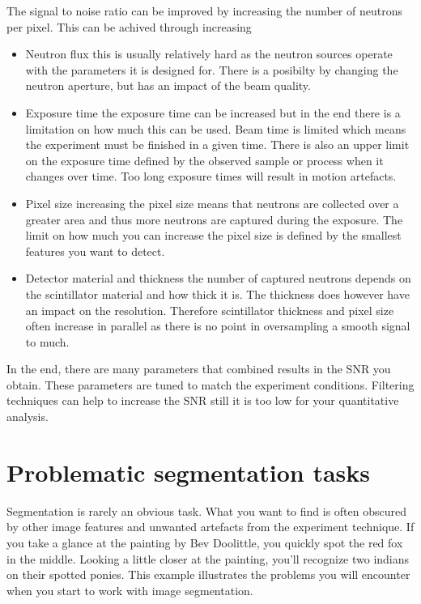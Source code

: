 \documentclass[letterpaper,10pt,english]{sphinxmanual}
\begin{document}
The signal to noise ratio can be improved by increasing the number of neutrons per pixel. This can be achived through increasing
\begin{itemize}
\item {} 
Neutron flux \sphinxhyphen{} this is usually relatively hard as the neutron sources operate with the parameters it is designed for. There is a posibilty by changing the neutron aperture, but has an impact of the beam quality.

\item {} 
Exposure time \sphinxhyphen{} the exposure time can be increased but in the end there is a limitation on how much this can be used. Beam time is limited which means the experiment must be finished in a given time. There is also an upper limit on the exposure time defined by the observed sample or process when it changes over time. Too long exposure times will result in motion artefacts.

\item {} 
Pixel size \sphinxhyphen{} increasing the pixel size means that neutrons are collected over a greater area and thus more neutrons are captured during the exposure. The limit on how much you can increase the pixel size is defined by the smallest features you want to detect.

\item {} 
Detector material and thickness \sphinxhyphen{} the number of captured neutrons depends on the scintillator material and how thick it is. The thickness does however have an impact on the resolution. Therefore scintillator thickness and pixel size often increase in parallel as there is no point in oversampling a smooth signal to much.

\end{itemize}

In the end, there are many parameters that combined results in the SNR you obtain. These parameters are tuned to match the experiment conditions. Filtering techniques can help to increase the SNR still it is too low for your quantitative analysis.


\section{Problematic segmentation tasks}
\label{\detokenize{ML4NeutronImageSegmentation:problematic-segmentation-tasks}}
Segmentation is rarely an obvious task. What you want to find is often obscured by other image features and unwanted artefacts from the experiment technique. If you take a glance at the painting by Bev Doolittle, you quickly spot the red fox in the middle. Looking a little closer at the painting, you’ll recognize two indians on their spotted ponies. This example illustrates the problems you will encounter when you start to work with image segmentation.
\end{document}
